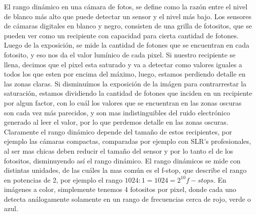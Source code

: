 \documentclass[a4paper,10pt]{article}
\begin{document}
        El rango dinámico en una cámara de fotos, se define como la razón entre el nivel de blanco más alto que puede detectar un sensor y el nivel más bajo. Los sensores de cámaras digitales en blanco y negro, consisten de una grilla de fotositos, que se pueden ver como un recipiente con capacidad para cierta cantidad de fotones. Luego de la exposición, se mide la cantidad de fotones que se encuentran en cada fotosito, y eso nos da el valor lumínico de cada pixel. Si nuestro recipiente se llena, decimos que el pixel esta saturado y va a detectar como valores iguales a todos los que esten por encima del máximo, luego, estamos perdiendo detalle en las zonas claras. Si disminuímos la exposición de la imágen para contrarrestar la saturación, estamos dividiendo la cantidad de fotones que inciden en un recipiente por algun factor, con lo cuál los valores que se encuentran en las zonas oscuras son cada vez más parecidos, y son mas indistinguibles del ruido electrónico generado al leer el valor, por lo que perdemos detalle en las zonas oscuras. Claramente el rango dinámico depende del tamaño de estos recipientes, por ejemplo las cámaras compactas, comparadas por ejemplo con SLR's profesionales, al ser mas chicas deben reducir el tamaño del sensor y por lo tanto el de los fotositos, disminuyendo así el rango dinámico. El rango dinámicos se mide con distintas unidades, de las cuáles la mas común es el f-stop, que describe el rango en potencias de 2, por ejemplo el rango $1024:1 = 1024 = 2^{10} f-stops$.
        En imágenes a color, simplemente tenemos 4 fotositos por pixel, donde cada uno detecta análogamente solamente en un rango de frecuencias cerca de rojo, verde o azul. 

    
    
\end{document}
